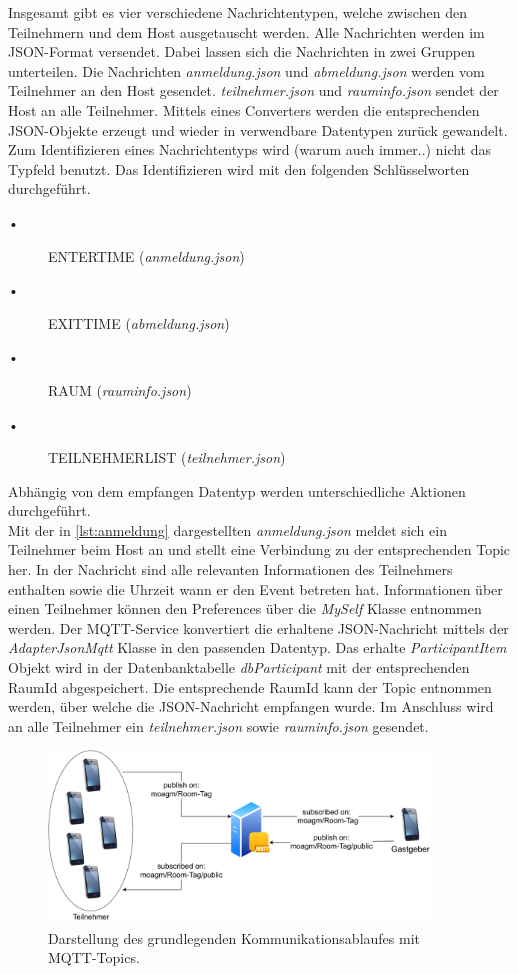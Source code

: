 Insgesamt gibt es vier verschiedene Nachrichtentypen, welche zwischen den Teilnehmern und dem Host ausgetauscht werden. Alle Nachrichten werden im JSON-Format versendet. 
Dabei lassen sich die Nachrichten in zwei Gruppen unterteilen.
Die Nachrichten \textit{anmeldung.json} und \textit{abmeldung.json} werden vom Teilnehmer an den Host gesendet. 
\textit{teilnehmer.json} und \textit{rauminfo.json} sendet der Host an alle Teilnehmer. 
Mittels eines Converters werden die entsprechenden JSON-Objekte erzeugt und wieder in verwendbare Datentypen zurück gewandelt. 
Zum Identifizieren eines Nachrichtentyps wird (warum auch immer..) nicht das Typfeld benutzt. 
Das Identifizieren wird mit den folgenden Schlüsselworten durchgeführt.
\begin{description}
\item[•] ENTERTIME (\textit{anmeldung.json})
\item[•] EXITTIME (\textit{abmeldung.json})
\item[•] RAUM (\textit{rauminfo.json})
\item[•] TEILNEHMERLIST (\textit{teilnehmer.json})
\end{description}
Abhängig von dem empfangen Datentyp werden unterschiedliche Aktionen durchgeführt.
\\
Mit der in \cref{lst:anmeldung} dargestellten \textit{anmeldung.json} meldet sich ein Teilnehmer beim Host an und stellt eine Verbindung zu der entsprechenden Topic her. In der Nachricht sind alle relevanten Informationen des Teilnehmers enthalten sowie die Uhrzeit wann er den Event betreten hat.
Informationen über einen Teilnehmer können den Preferences über die \textit{MySelf} Klasse entnommen werden. 
Der MQTT-Service konvertiert die erhaltene JSON-Nachricht mittels der \textit{AdapterJsonMqtt} Klasse in den passenden Datentyp. 
Das erhalte \textit{ParticipantItem} Objekt wird in der Datenbanktabelle \textit{dbParticipant} mit der  entsprechenden RaumId abgespeichert. 
Die entsprechende RaumId kann der Topic entnommen werden, über welche die JSON-Nachricht empfangen wurde. 
Im Anschluss wird an alle Teilnehmer ein \textit{teilnehmer.json} sowie \textit{rauminfo.json} gesendet.
\begin{figure}
	\centering
	\includegraphics[width =0.9\textwidth]{images/mqttservice.pdf}
	\caption{Darstellung des grundlegenden Kommunikationsablaufes mit MQTT-Topics.}
	\label{img:mqtt}
\end{figure}
